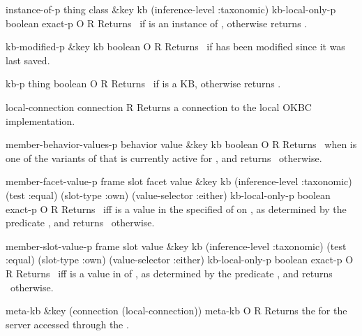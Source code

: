 \begin{okbcop}{instance-of-p}{ thing class \&key kb (inference-level :taxonomic) kb-local-only-p} { boolean exact-p } { O } { R } {  }
Returns \true\ if  is an instance of , otherwise
   returns \false.
\end{okbcop}

\begin{okbcop}{kb-modified-p}{ \&key kb} { boolean } { O } { R } {  }
Returns \true\ if  has been modified since it was last saved.
\end{okbcop}

\begin{okbcop}{kb-p}{ thing} { boolean } { O } { R } {  }
Returns \true\ if  is a KB, otherwise returns \false.
\end{okbcop}

\begin{okbcfun}{local-connection}{ } { connection } {   } { R } {  }
Returns a connection to the local OKBC implementation.
\end{okbcfun}

\begin{okbcop}{member-behavior-values-p}{ behavior value \&key kb} { boolean } { O } { R } {  }
Returns \true\ when  is one of the variants of
    that is currently active for , and returns
   \false\ otherwise.
\end{okbcop}

\begin{okbcop}{member-facet-value-p}{ frame slot facet value \&key kb (inference-level :taxonomic) (test :equal) (slot-type :own) (value-selector :either) kb-local-only-p} { boolean exact-p } { O } { R } {  }
Returns \true\ iff  is a value in the specified 
   of  on , as determined by the predicate 
   , and returns \false\ otherwise.
\end{okbcop}

\begin{okbcop}{member-slot-value-p}{ frame slot value \&key kb (inference-level :taxonomic) (test :equal) (slot-type :own) (value-selector :either) kb-local-only-p} { boolean exact-p } { O } { R } {  }
Returns \true\ iff  is a value in  of
   , as determined by the predicate , and returns
   \false\ otherwise.
\end{okbcop}

\begin{okbcop}{meta-kb}{ \&key (connection (local-connection))} { meta-kb } { O } { R } {  }
Returns the  for the server accessed through the
   .
\end{okbcop}


